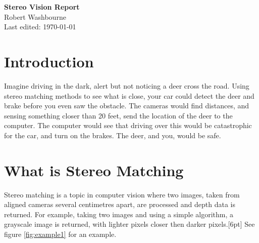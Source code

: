 \documentclass[11pt,fleqn]{article}
\begin{document}
\begin{center}
\Large{\textbf{Stereo Vision Report}}\\[5pt]
\large{Robert Washbourne}\\
Last edited: \today
\end{center}

\tableofcontents

\section{Introduction}

Imagine driving in the dark, alert but not noticing a deer cross the road. Using stereo matching methods to see what is close, your car could detect the deer and brake before you even saw the obstacle. The cameras would find distances, and sensing something closer than 20 feet, send the location of the deer to the computer. The computer would see that driving over this would be catastrophic for the car, and turn on the brakes. The deer, and you, would be safe.

\section{What is Stereo Matching}

Stereo matching is a topic in computer vision where two images, taken from aligned cameras several centimetres apart, are processed and depth data is returned. For example, taking two images and using a simple algorithm, a grayscale image is returned, with lighter pixels closer then darker pixels.[6pt]  See figure \ref{fig:example1} for an example.\\


\end{document}
